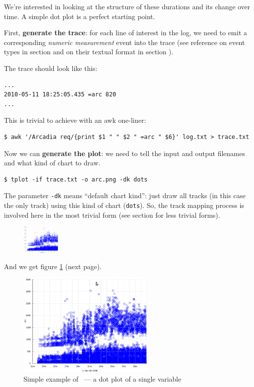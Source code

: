 \documentclass{article}
\begin{document}
We're interested in looking at the structure of these durations and its change over time. A simple dot plot is a perfect starting point.

First, \textbf{generate the trace}: for each line of interest in the log, we need to emit a corresponding \emph{numeric measurement} event into the trace (see reference on event types in section  and on their textual format in section ).

The trace should look like this:
\begin{verbatim}
...
2010-05-11 18:25:05.435 =arc 820
...
\end{verbatim}

This is trivial to achieve with an awk one-liner:
\begin{verbatim}
$ awk '/Arcadia req/{print $1 " " $2 " =arc " $6}' log.txt > trace.txt
\end{verbatim}

Now we can \textbf{generate the plot}: we need to tell \timeplot{} the input and output filenames and what kind of chart to draw.
\begin{verbatim}
$ tplot -if trace.txt -o arc.png -dk dots
\end{verbatim}

The parameter \verb|-dk| means ``default chart kind'': just draw all tracks (in this case the only track) using this kind of chart (\verb|dots|). So, the track mapping process is involved here in the most trivial form (see section  for less trivial forms).

\begin{figure}
\vspace{-25pt}
\center
\includegraphics[height=40pt]{pics/tplot/dots.png}
\end{figure}
And we get figure \ref{fig:tplot-simple-example} (next page).

\begin{figure}[h!]
\center
\includegraphics[width=0.6\textwidth]{pics/tplot/dots.png}
\caption{Simple example of \timeplot{}~--- a dot plot of a single variable}
\label{fig:tplot-simple-example}
\end{figure}
\end{document}
